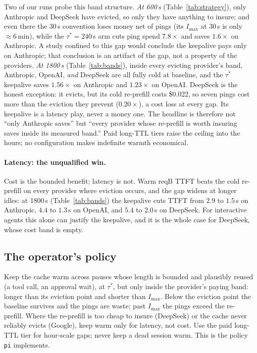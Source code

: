 \documentclass[10pt,twocolumn]{article}
\begin{document}
Two of our runs probe this band structure. \emph{At 600\,s}
(Table~\ref{tab:strategy}), only Anthropic and DeepSeek have evicted, so only
they have anything to insure; and even there the $30$\,s convention loses money
net of pings (its $I_{\max}$ at $30$\,s is only ${\approx}6$\,min), while the
$\tau^{\ast}{=}240$\,s arm cuts ping spend $7.8\times$ and saves $1.6\times$ on
Anthropic. A study confined to this gap would conclude the keepalive pays only
on Anthropic; that conclusion is an artifact of the gap, not a property of the
providers. \emph{At 1800\,s} (Table~\ref{tab:bands}), inside every evicting
provider's band, Anthropic, OpenAI, \emph{and} DeepSeek
are all fully cold at baseline, and the $\tau^{\ast}$ keepalive saves
$1.56\times$ on Anthropic and $1.23\times$ on OpenAI. DeepSeek is the honest
exception: it evicts, but its cold re-prefill costs \$0.022, so seven pings cost
more than the eviction they prevent ($0.20\times$), a cost loss at every gap.
Its keepalive is a latency play, never a money one. The headline is therefore
not ``only Anthropic saves'' but ``every provider whose re-prefill is worth
insuring saves inside its measured band.'' Paid long-TTL tiers raise the ceiling
into the hours; no configuration makes indefinite warmth economical.


\paragraph{Latency: the unqualified win.}
Cost is the bounded benefit; latency is not. Warm reqB TTFT beats the cold
re-prefill on every provider where eviction occurs, and the gap widens at longer
idles: at 1800\,s (Table~\ref{tab:bands}) the keepalive cuts TTFT from
$2.9$ to $1.5$\,s on Anthropic, $4.4$ to $1.3$\,s on OpenAI, and $5.4$ to
$2.0$\,s on DeepSeek. For interactive agents this alone can justify the
keepalive, and it is the whole case for DeepSeek, whose cost band is empty.

\subsection{The operator's policy}
Keep the cache warm across pauses whose length is bounded and plausibly reused
(a tool call, an approval wait), at $\tau^{\ast}$, but only inside the
provider's paying band: longer than its eviction point and shorter than
$I_{\max}$. Below the eviction point the baseline survives and the pings are
waste; past $I_{\max}$ the pings exceed the re-prefill. Where the re-prefill is
too cheap to insure (DeepSeek) or the cache never reliably evicts (Google), keep
warm only for latency, not cost. Use the paid long-TTL tier for hour-scale gaps;
never keep a dead session warm. This is the policy \texttt{pi} implements.
\end{document}
